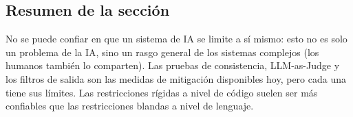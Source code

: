 \subsection{Resumen de la sección}

No se puede confiar en que un sistema de IA se limite a sí mismo: esto no es solo un problema de la IA, sino un rasgo general de los sistemas complejos (los humanos también lo comparten). Las pruebas de consistencia, LLM-as-Judge y los filtros de salida son las medidas de mitigación disponibles hoy, pero cada una tiene sus límites. Las restricciones rígidas a nivel de código suelen ser más confiables que las restricciones blandas a nivel de lenguaje.

